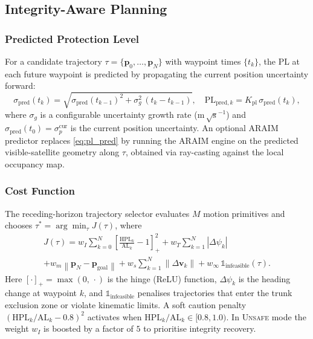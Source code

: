 \documentclass[journal]{IEEEtran}
\newcommand{\norm}[1]{\left\|#1\right\|}
\newcommand{\ve}{\mathbf{v}}
\newcommand{\hinge}[1]{\left[#1\right]_+}  %
\begin{document}
\subsection{Integrity-Aware Planning}
\label{sec:planning}

\subsubsection{Predicted Protection Level}

For a candidate trajectory $\tau = \{\mathbf{p}_0,\ldots,\mathbf{p}_N\}$
with waypoint times $\{t_k\}$, the PL at each future waypoint is
predicted by propagating the current position uncertainty forward:
\begin{equation}
  \sigma_{\mathrm{pred}}(t_k) = \sqrt{
    \sigma_{\mathrm{pred}}(t_{k-1})^2 + \sigma_g^2\,(t_k - t_{k-1})
  },
  \quad
  \mathrm{PL}_{\mathrm{pred},k} = K_{\mathrm{pl}}\,\sigma_{\mathrm{pred}}(t_k),
  \label{eq:pl_pred}
\end{equation}
where $\sigma_g$ is a configurable uncertainty growth rate
(m\,$\sqrt{\mathrm{s}}^{-1}$) and $\sigma_{\mathrm{pred}}(t_0) =
\sigma_p^{\mathrm{cur}}$ is the current position uncertainty.
An optional ARAIM predictor replaces \eqref{eq:pl_pred} by running the
ARAIM engine on the predicted visible-satellite geometry along $\tau$,
obtained via ray-casting against the local occupancy map.

\subsubsection{Cost Function}

The receding-horizon trajectory selector evaluates $M$ motion
primitives and chooses
$\tau^* = \arg\min_\tau J(\tau)$, where
\begin{multline}
  J(\tau) =
    w_I \sum_{k=0}^{N}
      \hinge{\frac{\mathrm{HPL}_k}{\mathrm{AL}_k} - 1}^{\!2}
    + w_T \sum_{k=1}^{N} |\Delta\psi_k|
    \\
    + w_m \norm{\mathbf{p}_N - \mathbf{p}_{\mathrm{goal}}}
    + w_s \sum_{k=1}^{N} \norm{\Delta\ve_k}
    + w_{\infty}\,\mathbb{1}_{\mathrm{infeasible}}(\tau).
  \label{eq:cost}
\end{multline}
Here $\hinge{\cdot} = \max(0,\,\cdot)$ is the hinge (ReLU) function,
$\Delta\psi_k$ is the heading change at waypoint $k$, and
$\mathbb{1}_{\mathrm{infeasible}}$ penalises trajectories that enter
the trunk exclusion zone or violate kinematic limits.
A soft caution penalty $(\mathrm{HPL}_k/\mathrm{AL}_k - 0.8)^2$
activates when $\mathrm{HPL}_k/\mathrm{AL}_k \in [0.8, 1.0)$.
In \textsc{Unsafe} mode the weight $w_I$ is boosted by a factor of
$5$ to prioritise integrity recovery.
\end{document}
